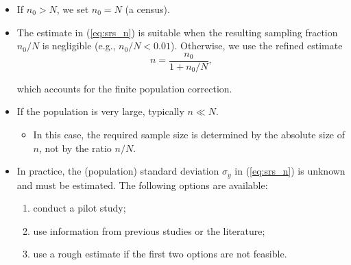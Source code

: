 \documentclass{my_eth_beamer}
\numberwithin{equation}{section}
\begin{document}
\begin{frame}
    \begin{itemize}
    \setlength{\itemsep}{12pt}
        \item If $n_0 > N$, we set $n_0 = N$ (a census).
        \item The estimate in (\ref{eq:srs_n}) is suitable when the resulting
            sampling fraction $n_0/N$ is negligible (e.g., $n_0/N < 0.01$).
            Otherwise, we use the \alert{refined estimate}
            \begin{equation*}
                n = \frac{n_0}{1 + n_0 / N},
            \end{equation*}

            \vspace{0.5em}

            \noindent which accounts for the \alert{finite population
            correction}.
        \item If the population is very large, typically $n \ll N$.
            \vspace{0.25em}
            \begin{itemize}
            \setlength{\itemsep}{6pt}
                \item[\goto] In this case, the required sample size is
                    determined by the \alert{absolute size} of $n$, not by the
                    ratio $n/N$.
            \end{itemize}

    \end{itemize}
\end{frame}

\begin{frame}
    \begin{itemize}
    \setlength{\itemsep}{8pt}
        \item In practice, the (population) standard deviation $\sigma_y$ in
            (\ref{eq:srs_n}) is \alert{unknown} and must be estimated. The
            following options are available:
            \vspace{0.5em}
            \begin{enumerate}
            \setlength{\itemsep}{6pt}
                \item conduct a \alert{pilot study};
                \item use information from \alert{previous studies} or the
                    literature;
                \item use a \alert{rough estimate} if the first two options
                    are not feasible.
            \end{enumerate}
    \end{itemize}
\end{frame}
\end{document}
